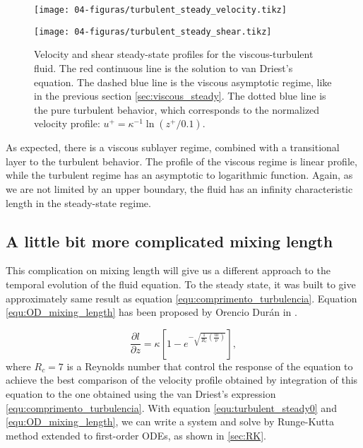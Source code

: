 \begin{apendicesenv}
\begin{figure}[H]
    \centering
    \parbox{0.495\textwidth}{
        \centering
        \texttt{[image: 04-figuras/turbulent\_steady\_velocity.tikz]}
        \label{fig:turbulent_steady_velocity}
    }
    \parbox{0.495\textwidth}{
        \centering
        \texttt{[image: 04-figuras/turbulent\_steady\_shear.tikz]}
        \label{fig:turbulent_steady_shear}
    }
    \caption[Steady-state numerical solution for viscous-turbulent fluid profiles.]{Velocity and shear steady-state profiles for the viscous-turbulent fluid. The red continuous line is the solution to van Driest's equation. The dashed blue line is the viscous asymptotic regime, like in the previous section \ref{sec:viscous_steady}. The dotted blue line is the pure turbulent behavior, which corresponds to the normalized velocity profile: $u^+=\kappa^{-1}\ln(z^+/0.1)$.}
    \label{fig:turbulent_steady}
\end{figure}

    As expected, there is a viscous sublayer regime, combined with a transitional layer to the turbulent behavior. The profile of the viscous regime is linear profile, while the turbulent regime has an asymptotic to logarithmic function. Again, as we are not limited by an upper boundary, the fluid has an infinity characteristic length in the steady-state regime.

        \subsection{A little bit more complicated mixing length}
    This complication on mixing length will give us a different approach to the temporal evolution of the fluid equation. To the steady state, it was built to give approximately same result as equation \ref{equ:comprimento_turbulencia}. Equation \ref{equ:OD_mixing_length} has been proposed by Orencio Durán in \cite{Numerical_simulation_of_turbulent_sediment_transport}.

\begin{equation}
    \frac{\partial l}{\partial z} = \kappa \left[1-e^{-\sqrt{\frac{1}{R_c}\left(\frac{ul}{\nu}\right)}}\right],
    \label{equ:OD_mixing_length}
\end{equation}
where $R_c = 7$ is a Reynolds number that control the response of the equation to achieve the best comparison of the velocity profile obtained by integration of this equation to the one obtained using the van Driest's expression \ref{equ:comprimento_turbulencia}. With equation \ref{equ:turbulent_steady0} and \ref{equ:OD_mixing_length}, we can write a system and solve by Runge-Kutta method extended to first-order ODEs, as shown in \ref{sec:RK}.

\end{apendicesenv}
